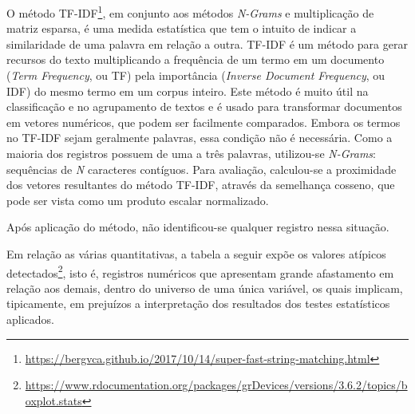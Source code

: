 \documentclass[
  12,
  table]{proadi}
\begin{document}
O método TF-IDF\footnote{\url{https://bergvca.github.io/2017/10/14/super-fast-string-matching.html}},
em conjunto aos métodos \emph{N-Grams} e multiplicação de matriz
esparsa, é uma medida estatística que tem o intuito de indicar a
similaridade de uma palavra em relação a outra. TF-IDF é um método para
gerar recursos do texto multiplicando a frequência de um termo em um
documento (\emph{Term Frequency}, ou TF) pela importância (\emph{Inverse
Document Frequency}, ou IDF) do mesmo termo em um corpus inteiro. Este
método é muito útil na classificação e no agrupamento de textos e é
usado para transformar documentos em vetores numéricos, que podem ser
facilmente comparados. Embora os termos no TF-IDF sejam geralmente
palavras, essa condição não é necessária. Como a maioria dos registros
possuem de uma a três palavras, utilizou-se \emph{N-Grams}: sequências
de \emph{N} caracteres contíguos. Para avaliação, calculou-se a
proximidade dos vetores resultantes do método TF-IDF, através da
semelhança cosseno, que pode ser vista como um produto escalar
normalizado.

Após aplicação do método, não identificou-se qualquer registro nessa
situação.

Em relação as várias quantitativas, a tabela a seguir expõe os valores
atípicos detectados\footnote{\url{https://www.rdocumentation.org/packages/grDevices/versions/3.6.2/topics/boxplot.stats}},
isto é, registros numéricos que apresentam grande afastamento em relação
aos demais, dentro do universo de uma única variável, os quais implicam,
tipicamente, em prejuízos a interpretação dos resultados dos testes
estatísticos aplicados.

\begingroup\fontsize{10}{12}\selectfont
\end{document}
